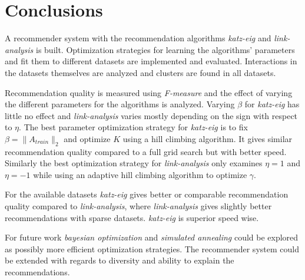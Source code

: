 \chapter{Conclusions}\label{cha:conclusions}

A recommender system with the recommendation algorithms \textit{katz-eig} and \textit{link-analysis} is built. Optimization strategies for learning the algorithms' parameters and fit them to different datasets are implemented and evaluated. Interactions in the datasets themselves are analyzed and clusters are found in all datasets.

Recommendation quality is measured using \textit{F-measure} and the effect of varying the different parameters for the algorithms is analyzed. Varying $\beta$ for \textit{katz-eig} has little no effect and \textit{link-analysis} varies mostly depending on the sign with respect to $\eta$. The best parameter optimization strategy for \textit{katz-eig} is to fix $\beta = \| A_{train}\|_2$ and optimize $K$ using a hill climbing algorithm. It gives similar recommendation quality compared to a full grid search but with better speed. Similarly the best optimization strategy for \textit{link-analysis} only examines $\eta = 1$ and $\eta = -1$ while using an adaptive hill climbing algorithm to optimize $\gamma$.

For the available datasets \textit{katz-eig} gives better or comparable recommendation quality compared to \textit{link-analysis}, where \textit{link-analysis} gives slightly better recommendations with sparse datasets. \textit{katz-eig} is superior speed wise.

For future work \textit{bayesian optimization} and \textit{simulated annealing} could be explored as possibly more efficient optimization strategies.  The recommender system could be extended with regards to diversity and ability to explain the recommendations.

